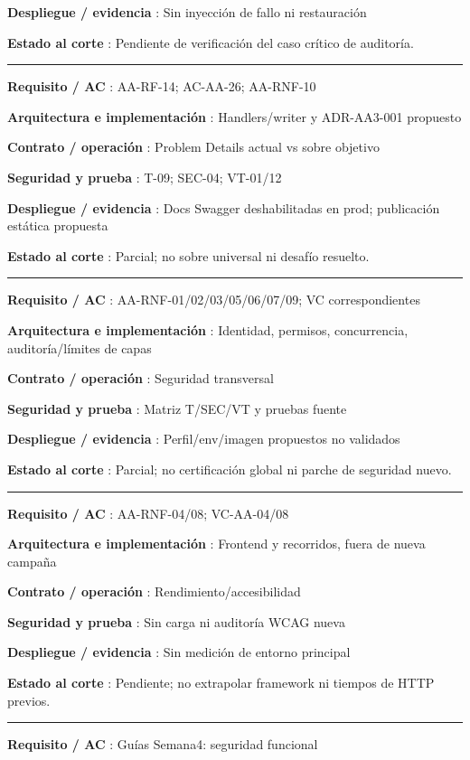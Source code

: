 \documentclass[12pt,a4paper]{report}
\begin{document}
\textbf{Despliegue / evidencia }: Sin inyección de fallo ni restauración

\textbf{Estado al corte }: Pendiente de verificación del caso crítico de
auditoría.

\medskip\hrule\medskip

\textbf{Requisito / AC }: AA-RF-14; AC-AA-26; AA-RNF-10

\textbf{Arquitectura e implementación }: Handlers/writer y ADR-AA3-001
propuesto

\textbf{Contrato / operación }: Problem Details actual vs sobre objetivo

\textbf{Seguridad y prueba }: T-09; SEC-04; VT-01/12

\textbf{Despliegue / evidencia }: Docs Swagger deshabilitadas en prod;
publicación estática propuesta

\textbf{Estado al corte }: Parcial; no sobre universal ni desafío
resuelto.

\medskip\hrule\medskip

\textbf{Requisito / AC }: AA-RNF-01/02/03/05/06/07/09; VC
correspondientes

\textbf{Arquitectura e implementación }: Identidad, permisos,
concurrencia, auditoría/límites de capas

\textbf{Contrato / operación }: Seguridad transversal

\textbf{Seguridad y prueba }: Matriz T/SEC/VT y pruebas fuente

\textbf{Despliegue / evidencia }: Perfil/env/imagen propuestos no
validados

\textbf{Estado al corte }: Parcial; no certificación global ni parche de
seguridad nuevo.

\medskip\hrule\medskip

\textbf{Requisito / AC }: AA-RNF-04/08; VC-AA-04/08

\textbf{Arquitectura e implementación }: Frontend y recorridos, fuera de
nueva campaña

\textbf{Contrato / operación }: Rendimiento/accesibilidad

\textbf{Seguridad y prueba }: Sin carga ni auditoría WCAG nueva

\textbf{Despliegue / evidencia }: Sin medición de entorno principal

\textbf{Estado al corte }: Pendiente; no extrapolar framework ni tiempos
de HTTP previos.

\medskip\hrule\medskip

\textbf{Requisito / AC }: Guías Semana4: seguridad funcional
\end{document}
